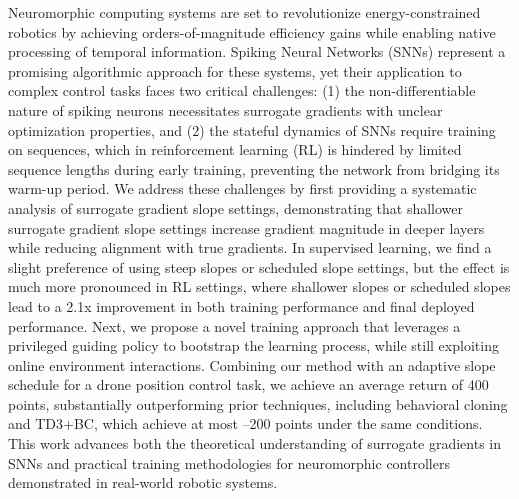 Neuromorphic computing systems are set to revolutionize energy-constrained robotics by achieving orders-of-magnitude efficiency gains while enabling native processing of temporal information. Spiking Neural Networks (SNNs) represent a promising algorithmic approach for these systems, yet their application to complex control tasks faces two critical challenges: (1) the non-differentiable nature of spiking neurons necessitates surrogate gradients with unclear optimization properties, and (2) the stateful dynamics of SNNs require training on sequences, which in reinforcement learning (RL) is hindered by limited sequence lengths during early training, preventing the network from bridging its warm-up period.
We address these challenges by first providing a systematic analysis of surrogate gradient slope settings, demonstrating that shallower surrogate gradient slope settings increase gradient magnitude in deeper layers while reducing alignment with true gradients. In supervised learning, we find a slight preference of using steep slopes or scheduled slope settings, but the effect is much more pronounced in RL settings, where shallower slopes or scheduled slopes lead to a 2.1x improvement in both training performance and final deployed performance. Next, we propose a novel training approach that leverages a privileged guiding policy to bootstrap the learning process, while still exploiting online environment interactions. Combining our method with an adaptive slope schedule for a drone position control task, we achieve an average return of 400 points, substantially outperforming prior techniques, including behavioral cloning and TD3+BC, which achieve at most –200 points under the same conditions. This work advances both the theoretical understanding of surrogate gradients in SNNs and practical training methodologies for neuromorphic controllers demonstrated in real-world robotic systems.